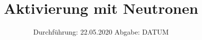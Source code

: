 

\subject{702}
\title{Aktivierung mit Neutronen}
\date{%
  Durchführung: 22.05.2020
  \hspace{3em}
  Abgabe: DATUM
}



\maketitle
\thispagestyle{empty}
\tableofcontents
\newpage






\nocite{702}
\printbibliography{}


